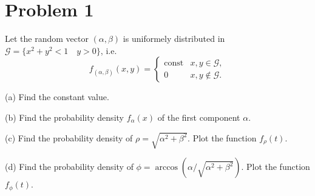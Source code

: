 \section*{Problem 1}

Let the random vector $(\alpha, \beta)$ is uniformely distributed in $\mathcal{G} = \{x^2 + y^2 < 1\quad y > 0 \}$, i.e.
\[
    f_{(\alpha, \beta)}(x, y) =
    \begin{cases}
        \text{const} & x, y \in \mathcal{G},    \\
        0            & x, y \notin \mathcal{G}.
    \end{cases}
\]

(a) Find the constant value.

(b) Find the probability density $f_\alpha(x)$ of the first component $\alpha$.

(c) Find the probability density of $\rho = \sqrt{\alpha^2 + \beta^2}$. Plot the function $f_\rho(t)$.

(d) Find the probability density of $\phi = \arccos(\alpha/\sqrt{\alpha^2 + \beta^2})$. Plot the function $f_\phi(t)$.
